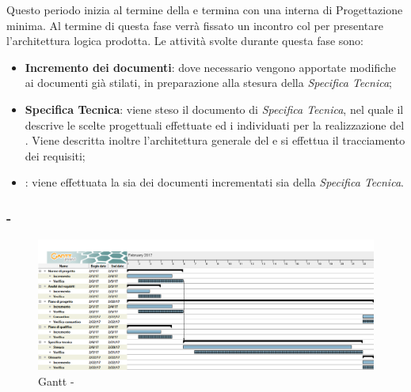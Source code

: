 \documentclass[./PianoDiProgetto.tex]{subfiles}
\begin{document}
\begin{itemize}
  Questo periodo inizia al termine della \PerAD{} e termina con una  interna di \label{Revisione} Progettazione minima. Al termine di questa fase verrà fissato un incontro col  per presentare l'architettura logica prodotta. Le attività svolte durante questa fase sono:
  \begin{itemize}
    \item \textbf{Incremento dei documenti}: dove necessario vengono apportate modifiche ai documenti già stilati, in preparazione alla stesura della \textit{Specifica Tecnica};
    \item \textbf{Specifica Tecnica}: viene steso il documento di \textit{Specifica Tecnica}, nel quale il \PJ{} descrive le scelte progettuali effettuate ed i  individuati per la realizzazione del . Viene descritta inoltre l'architettura generale del  e si effettua il tracciamento dei requisiti;
    \item \textbf{}: viene effettuata la  sia dei documenti incrementati sia della \textit{Specifica Tecnica}.
  \end{itemize}

  \end{itemize}

  \subsubsection{ - \PerPA}
    \begin{figure}[!h]
    \centering
    \includegraphics[width=\textwidth]{images/PA}
    \caption{Gantt - \PerPA}
    \end{figure}
\end{document}

